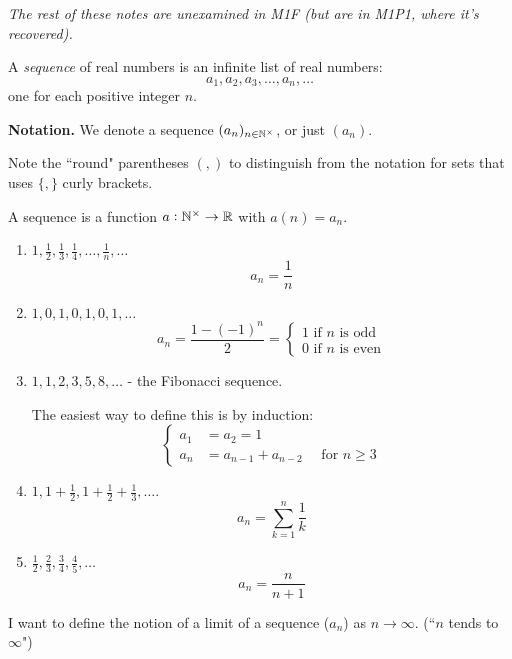 \documentclass[twoside]{scrartcl}
\begin{document}
\emph{The rest of these notes are unexamined in M1F (but are in M1P1, where it's recovered).}\\

\begin{definition}
A \emph{sequence} of real numbers is an infinite list of real numbers: 
\[a_1,a_2,a_3,\dots,a_n,\dots\]	
one for each positive integer $n$.
\end{definition}

\textbf{Notation.} We denote a sequence $(a_n)_{n \in\mathbb{N}^{\times}}$, or just $(a_n)$. 

Note the ``round" parentheses $(,)$ to distinguish from the notation for sets that uses $\{,\}$ curly brackets. 

\begin{remark}
A sequence is a function $a: \mathbb{N}^\times \to \mathbb{R}$ with $a(n) = a_n$. 	
\end{remark}



\begin{examples}
\begin{enumerate}
\item $1,\frac{1}{2},\frac{1}{3},\frac{1}{4},\dots,\frac{1}{n},\dots$
\[a_n = \frac{1}{n}\]

\item $1,0,1,0,1,0,1,\dots$
\[a_n = \frac{1-(-1)^n}{2} = \begin{cases}
1 \mbox{ if $n$ is odd}\\
0 \mbox{ if $n$ is even}	
 \end{cases}
\]	
	
\item $1,1,2,3,5,8,\dots$ - the Fibonacci sequence. 

The easiest way to define this is by induction:
\[\begin{cases}
a_1 &= a_2 = 1\\
a_n &= a_{n-1} + a_{n-2} \quad \text{ for } n \geq 3	
\end{cases}
\]
\item $1,1 + \frac{1}{2}, 1 + \frac{1}{2}+ \frac{1}{3},\dots$. 
\[a_n = \sum_{k=1}^n \frac{1}{k}\]
\item $\frac{1}{2},\frac{2}{3},\frac{3}{4},\frac{4}{5},\dots$
\[a_n = \frac{n}{n+1}\]
\end{enumerate}
\end{examples}

I want to define the notion of a limit of a sequence ($a_n$) as $n \to \infty$. (``$n$ tends to $\infty$")\\
\end{document}
